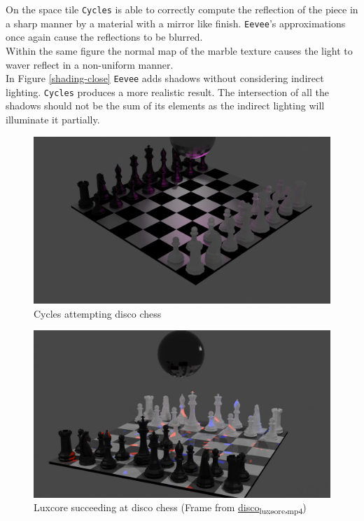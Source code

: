 \documentclass[11pt]{article}
\begin{document}
On the space tile \texttt{Cycles} is able to correctly compute the reflection of the
piece in a sharp manner by a material with a mirror like finish.
\texttt{Eevee}'s approximations once again cause the reflections to be blurred.\\

Within the same figure the normal map of the marble texture causes the light to
waver reflect in a non-uniform manner.\\

In Figure \ref{shading-close} \texttt{Eevee} adds shadows without considering indirect
lighting. \texttt{Cycles} produces a more realistic result. The intersection of all the
shadows should not be the sum of its elements as the indirect lighting will
illuminate it partially.

\begin{figure}[htbp]
\centering
\includegraphics[width=\textwidth]{Images/Disco kinda working.png}
\caption{Cycles attempting disco chess}
\end{figure}

\begin{figure}[htbp]
\centering
\includegraphics[width=\textwidth]{Images/mpv-shot0001.jpg}
\caption{Luxcore succeeding at disco chess (Frame from \href{https://github.com/Jake-Moss/blender-chess/blob/master/Videos/disco\_luxcore.mp4}{disco\textsubscript{luxcore.mp4}})}
\end{figure}
\end{document}

